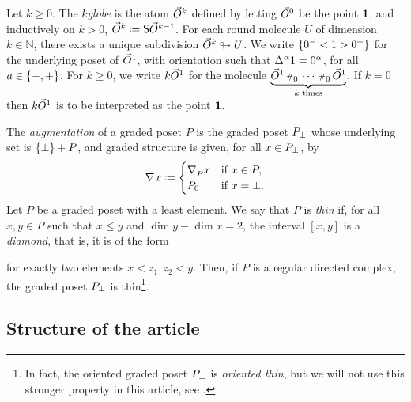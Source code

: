 Let \( k \geq 0 \).
The \emph{\( k \)\nbd globe} is the atom \( \dglobe{k} \) defined by letting \( \dglobe{0} \) be the point \( \pt \), and inductively on \( k > 0 \), \( \dglobe{k} \eqdef \sus{\dglobe{k - 1}} \).
For each round molecule \( U \) of dimension \( k \in \mathbb{N} \), there exists a unique subdivision \( \dglobe{k} \sd U \).
We write \( \set{0^- < 1 > 0^+} \) for the underlying poset of \( \dglobe{1} \), with orientation such that \( \faces{}{\a} 1 = 0^\a \), for all \( a \in \set{-, +} \).
For \( k \geq 0 \), we write \( k\arr \) for the molecule \( \underbrace{\arr \cp{0} \cdots \cp{0} \arr}_{k \text{ times}} \).
If \( k = 0 \) then \( k\arr \) is to be interpreted as the point \( \pt \).

The \emph{augmentation} of a graded poset \( P \) is the graded poset \( \augm{P} \) whose underlying set is \( \set{\bot} + P \), and graded structure is given, for all \( x \in \augm{P} \), by
\begin{equation*}
    \cofaces{}{} x \eqdef
    \begin{cases}
        \cofaces{P}{} x &\text{if } x \in P,\\
        \gr{0}{P}         &\text{if } x = \bot.
    \end{cases}
\end{equation*}
Let \( P \) be a graded poset with a least element.
We say that \( P \) is \emph{thin} if, for all \( x, y \in P \) such that \( x \le y \) and \( \dim y - \dim x = 2 \), the interval \( [x, y] \) is a \emph{diamond}, that is, it is of the form 
\begin{center}
\end{center}
for exactly two elements \( x < z_1, z_2 < y \).
Then, if \( P \) is a regular directed complex, the graded poset \( \augm{P} \) is thin\footnote{In fact, the oriented graded poset \( \augm{P} \) is \emph{oriented thin}, but we will not use this stronger property in this article, see \cite[2.3.10]{hadzihasanovic2024combinatorics}.}.

\subsection*{Structure of the article}

